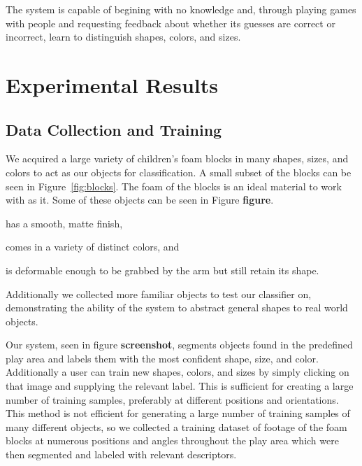 \documentclass[11pt]{article}
\newcommand{\meh}[1]{{\bf \color{blue} #1}}
\begin{document}
{The system is capable of begining with no knowledge and, through playing games
with people and requesting feedback about whether its guesses are correct or
incorrect, learn to distinguish shapes, colors, and sizes.

\section{Experimental Results}

\subsection{Data Collection and Training}
We acquired a large variety of children's foam blocks in many shapes, sizes,
and colors to act as our objects for classification. A small subset of the
blocks can be seen in Figure~\ref{fig:blocks}. The foam of the blocks is an
ideal material to work with as it. Some of these
objects can be seen in Figure \meh{figure}.
\begin{inparaenum}[(1)]
\item has a smooth, matte finish,
\item comes in a variety of distinct colors, and
\item is deformable enough to be grabbed by the arm but still retain its
shape.
\end{inparaenum}
Additionally we collected
more familiar objects to test our classifier on, demonstrating the ability of
the system to abstract general shapes to real world objects.

Our system, seen in figure \meh{screenshot}, segments objects found in the
predefined play area and labels them with the most confident shape, size, and
color.  Additionally a user can train new shapes, colors, and sizes by simply
clicking on that image and supplying the relevant label.  This is sufficient
for creating a large number of training samples, preferably at different
positions and orientations.  This method is not efficient for generating a
large number of training samples of many different objects, so we collected a
training dataset of footage of the foam blocks at numerous positions and angles
throughout the play area which were then segmented and labeled with relevant
descriptors.


}
\end{document}
